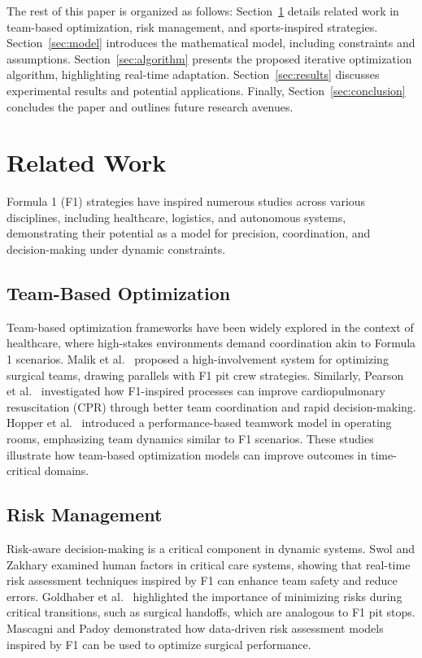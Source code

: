 \documentclass[preprint,12pt]{elsarticle}
\begin{document}
The rest of this paper is organized as follows: Section~\ref{sec:related} details related work in team-based optimization, risk management, and sports-inspired strategies. Section~\ref{sec:model} introduces the mathematical model, including constraints and assumptions. Section~\ref{sec:algorithm} presents the proposed iterative optimization algorithm, highlighting real-time adaptation. Section~\ref{sec:results} discusses experimental results and potential applications. Finally, Section~\ref{sec:conclusion} concludes the paper and outlines future research avenues.

\section{Related Work}
\label{sec:related}

Formula 1 (F1) strategies have inspired numerous studies across various disciplines, including healthcare, logistics, and autonomous systems, demonstrating their potential as a model for precision, coordination, and decision-making under dynamic constraints.

\subsection{Team-Based Optimization}

Team-based optimization frameworks have been widely explored in the context of healthcare, where high-stakes environments demand coordination akin to Formula 1 scenarios. Malik et al.\ \cite{malik2023managing} proposed a high-involvement system for optimizing surgical teams, drawing parallels with F1 pit crew strategies. Similarly, Pearson et al.\ \cite{pearson2024effectiveness} investigated how F1-inspired processes can improve cardiopulmonary resuscitation (CPR) through better team coordination and rapid decision-making. Hopper et al.\ \cite{hopper2022performance} introduced a performance-based teamwork model in operating rooms, emphasizing team dynamics similar to F1 scenarios. These studies illustrate how team-based optimization models can improve outcomes in time-critical domains.

\subsection{Risk Management}

Risk-aware decision-making is a critical component in dynamic systems. Swol and Zakhary \cite{swol2022human} examined human factors in critical care systems, showing that real-time risk assessment techniques inspired by F1 can enhance team safety and reduce errors. Goldhaber et al.\ \cite{goldhaber2023surgical} highlighted the importance of minimizing risks during critical transitions, such as surgical handoffs, which are analogous to F1 pit stops. Mascagni and Padoy \cite{mascagni2021or} demonstrated how data-driven risk assessment models inspired by F1 can be used to optimize surgical performance.
\end{document}
